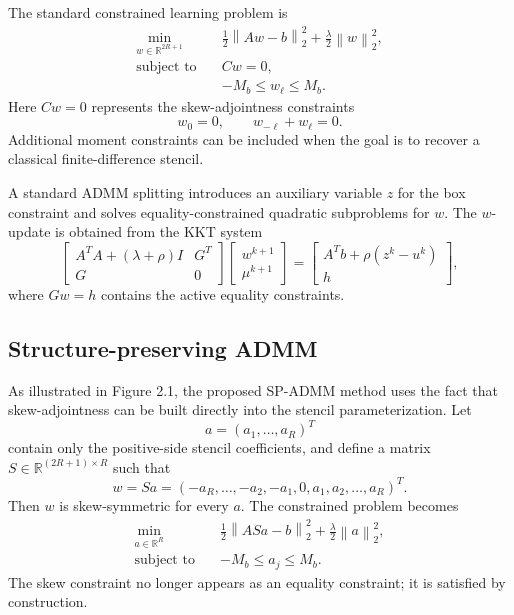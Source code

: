\documentclass[11pt]{article}
\numberwithin{equation}{section}
\numberwithin{figure}{section}
\numberwithin{table}{section}
\newcommand{\R}{\mathbb{R}}
\newcommand{\norm}[2]{\left\|#1\right\|_{#2}}
\begin{document}
The standard constrained learning problem is
\begin{equation}
\begin{aligned}
  \min_{w\in\R^{2R+1}}
  \quad&
  \frac12\norm{Aw-b}{2}^2+\frac{\lambda}{2}\norm{w}{2}^2,\\
  \text{subject to}\quad&
  Cw=0,\\
  & -M_b\le w_\ell\le M_b.
\end{aligned}
\label{eq:full-qP}
\end{equation}
Here $Cw=0$ represents the skew-adjointness constraints
\[
  w_0=0,\qquad w_{-\ell}+w_\ell=0.
\]
Additional moment constraints can be included when the goal is to recover a
classical finite-difference stencil.

A standard ADMM splitting introduces an auxiliary variable $z$ for the box
constraint and solves equality-constrained quadratic subproblems for $w$.
The $w$-update is obtained from the KKT system
\begin{equation}
\begin{bmatrix}
A^TA+(\lambda+\rho)I & G^T\\
G & 0
\end{bmatrix}
\begin{bmatrix}
w^{k+1}\\
\mu^{k+1}
\end{bmatrix}
=
\begin{bmatrix}
A^Tb+\rho(z^k-u^k)\\
h
\end{bmatrix},
\label{eq:kkt}
\end{equation}
where $Gw=h$ contains the active equality constraints.

\subsection{Structure-preserving ADMM}
As illustrated in Figure 2.1, the proposed SP-ADMM method uses the fact that skew-adjointness can be built directly into the stencil parameterization. Let
\[
  a=(a_1,\ldots,a_R)^T
\]
contain only the positive-side stencil coefficients, and define a matrix
$S\in\R^{(2R+1)\times R}$ such that
\begin{equation}
  w=Sa=
  (-a_R,\ldots,-a_2,-a_1,0,a_1,a_2,\ldots,a_R)^T.
  \label{eq:skew-param}
\end{equation}
Then $w$ is skew-symmetric for every $a$. The constrained problem becomes
\begin{equation}
\begin{aligned}
  \min_{a\in\R^R}
  \quad&
  \frac12\norm{ASa-b}{2}^2+\frac{\lambda}{2}\norm{a}{2}^2,\\
  \text{subject to}\quad&
  -M_b\le a_j\le M_b.
\end{aligned}
\label{eq:sp-problem}
\end{equation}
The skew constraint no longer appears as an equality constraint; it is
satisfied by construction.
\end{document}
